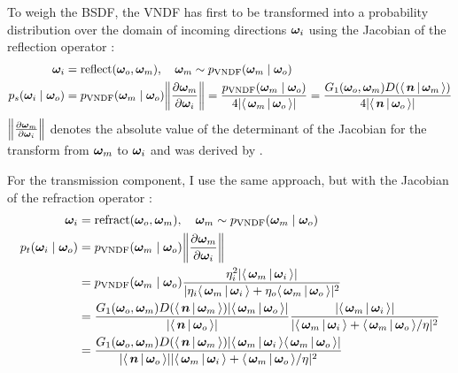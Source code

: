 To weigh the BSDF, the VNDF has first to be transformed into a probability distribution over the domain of incoming directions ${\bm{\omega}_i}$ using the Jacobian of the reflection operator \parencite{walter2007}:
\begin{equation}
    \begin{aligned}
        \wi &= \reflect(\wo, \wm), \quad \wm \sim p_\mathrm{VNDF}(\wm \mid \wo)\\
        p_s(\wi \mid \wo)
        &= p_\mathrm{VNDF}(\wm \mid \wo) \left\|\frac{\partial \wm}{\partial \wi}\right\|
        = \frac{p_\mathrm{VNDF}(\wm \mid \wo)}{4|\VdotH|}
        = \frac{G_1(\wo, \wm) D(\NdotH)}{4|\NdotV|}
    \end{aligned}
\end{equation}
$\left\|\frac{\partial \wm}{\partial \wi}\right\|$ denotes the absolute value of the determinant of the Jacobian for the transform from $\bm{\omega}_m$ to ${\bm{\omega}_i}$ and was derived by \textcite{walter2007}.

For the transmission component, I use the same approach, but with the Jacobian of the refraction operator \parencite{walter2007}:
\begin{equation}
    \begin{aligned}
        \wi &= \refract(\wo, \wm), \quad \wm \sim p_\mathrm{VNDF}(\wm \mid \wo)\\
        p_t(\wi \mid \wo)
        &= p_\mathrm{VNDF}(\wm \mid \wo) \left\|\frac{\partial \wm}{\partial \wi}\right\| \\
        &= p_\mathrm{VNDF}(\wm \mid \wo) \frac{\eta_i^2 |\LdotH|}{|\eta_i \LdotH + \eta_o \VdotH|^2} \\
        &= \frac{G_1(\wo, \wm) D(\NdotH) |\VdotH|}{|\NdotV|} \frac{|\LdotH|}{|\LdotH + \VdotH / \eta|^2} \\
        &= \frac{G_1(\wo, \wm) D(\NdotH) |\LdotH \VdotH|}{|\NdotV| |\LdotH + \VdotH / \eta|^2}
    \end{aligned}
\end{equation}

